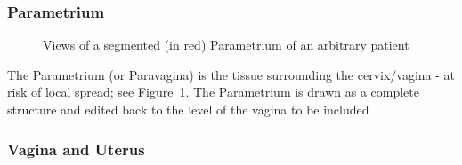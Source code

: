 \documentclass[12pt,twoside]{report}
\begin{document}
\subsubsection{Parametrium}\label{sec:data-Parametrium}

\begin{figure}[H]
  \caption{Views of a segmented (in red) Parametrium of an arbitrary patient}
 \label{fig:example-Parametrium}
\end{figure}

The Parametrium (or Paravagina) is the tissue surrounding the cervix/vagina - at risk of local spread; see Figure~\ref{fig:example-Parametrium}. The Parametrium is drawn as a complete structure and edited back to the level of the vagina to be included~\cite{AMLART-data}.

\subsubsection{Vagina and Uterus}
\end{document}
